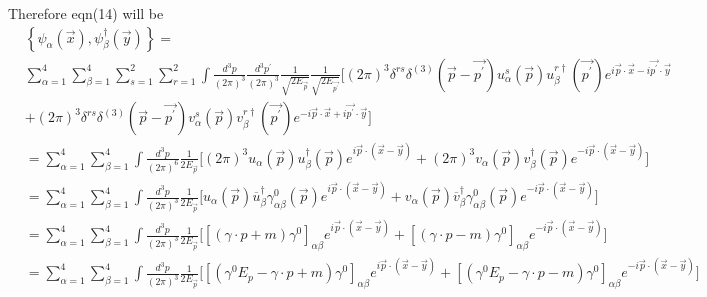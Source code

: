 \documentclass[12pt, letterpaper]{article}
\newcommand*{\1}{\hspace{1pt}}
\begin{document}
Therefore eqn(14) will be 
\begin{align*}
    &\left\{ \psi _{\alpha} (\overrightarrow{x}) , \psi ^{\dagger} _{\beta }(\overrightarrow{y})  \right\} =  \\
    & \sum_{\alpha = 1}^{4}\sum_{\beta = 1}^{4} \sum_{s = 1}^{2} \sum_{r = 1}^{2} \int \frac{d ^{3} p}{(2 \pi) ^{3}}\frac{d ^{3} p ^{\prime}}{(2 \pi) ^{3}} \frac{1}{\sqrt{2 E _{\overrightarrow{p}}}} \frac{1}{\sqrt{2 E _{\overrightarrow{p^{\prime}}}}}\bigg[ (2 \pi) ^{3} \delta ^{rs} \delta ^{(3)}(\overrightarrow{p} - \overrightarrow{p ^{\prime}}) u^{s} _{\alpha}(\overrightarrow{p})u^{r \dagger} _{\beta}(\overrightarrow{p ^{\prime}})e ^{i \overrightarrow{p} \cdot \overrightarrow{x} -i \overrightarrow{p^{\prime}} \cdot \overrightarrow{y}} \\
    & + (2 \pi) ^{3} \delta ^{rs} \delta ^{(3)}(\overrightarrow{p} - \overrightarrow{p ^{\prime}}) v^{s} _{\alpha}(\overrightarrow{p})v^{r \dagger} _{\beta}(\overrightarrow{p ^{\prime}})e ^{-i \overrightarrow{p} \cdot \overrightarrow{x} +i \overrightarrow{p^{\prime}} \cdot \overrightarrow{y}} \bigg] \\
    &= \sum_{\alpha = 1}^{4}\sum_{\beta = 1}^{4} \int \frac{d ^{3} p}{(2 \pi) ^{6}} \frac{1}{{2 E _{\overrightarrow{p}}}} \bigg[ (2 \pi) ^{3} u _{\alpha}(\overrightarrow{p})u^{\dagger} _{\beta}(\overrightarrow{p})e ^{i \overrightarrow{p} \cdot (\overrightarrow{x} - \overrightarrow{y})} + (2 \pi) ^{3} v _{\alpha}(\overrightarrow{p})v^{\dagger} _{\beta}(\overrightarrow{p})e ^{-i \overrightarrow{p} \cdot (\overrightarrow{x} - \overrightarrow{y})} \bigg] \\
    &= \sum_{\alpha = 1}^{4}\sum_{\beta = 1}^{4} \int \frac{d ^{3} p}{(2 \pi) ^{3}} \frac{1}{{2 E _{\overrightarrow{p}}}} \bigg[ u _{\alpha}(\overrightarrow{p})\overline{u}^{\dagger} _{\beta} \gamma ^{0} _{\alpha \beta}(\overrightarrow{p})e ^{i \overrightarrow{p} \cdot (\overrightarrow{x} - \overrightarrow{y})} +  v _{\alpha}(\overrightarrow{p})\overline{v}^{\dagger} _{\beta} \gamma ^{0} _{\alpha \beta}(\overrightarrow{p})e ^{-i \overrightarrow{p} \cdot (\overrightarrow{x} - \overrightarrow{y})} \bigg] \\
    &= \sum_{\alpha = 1}^{4}\sum_{\beta = 1}^{4} \int \frac{d ^{3} p}{(2 \pi) ^{3}} \frac{1}{{2 E _{\overrightarrow{p}}}} \bigg[ [(\gamma \cdot p + m)\gamma ^{0} ]_{\alpha \beta}e ^{i \overrightarrow{p} \cdot (\overrightarrow{x} - \overrightarrow{y})} + [(\gamma \cdot p - m)\gamma ^{0} ]_{\alpha \beta} e ^{-i \overrightarrow{p} \cdot (\overrightarrow{x} - \overrightarrow{y})} \bigg] \\
    &= \sum_{\alpha = 1}^{4}\sum_{\beta = 1}^{4} \int \frac{d ^{3} p}{(2 \pi) ^{3}} \frac{1}{{2 E _{\overrightarrow{p}}}} \bigg[ [(\gamma ^{0} E _{p} -\gamma \cdot p + m)\gamma ^{0} ]_{\alpha \beta}e ^{i \overrightarrow{p} \cdot (\overrightarrow{x} - \overrightarrow{y})} + [(\gamma ^{0} E _{p} -\gamma \cdot p - m)\gamma ^{0} ]_{\alpha \beta} e ^{-i \overrightarrow{p} \cdot (\overrightarrow{x} - \overrightarrow{y})} \bigg] \\
\end{align*}
\end{document}
